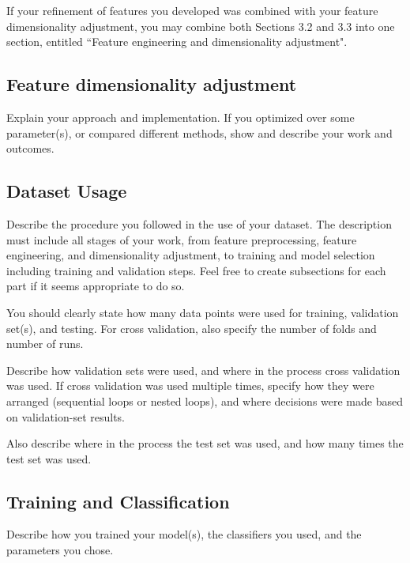 \documentclass[singlecolumn]{article}
\begin{document}
If your refinement of features you developed was combined with your feature dimensionality adjustment, you may combine both Sections 3.2 and 3.3 into one section, entitled ``Feature engineering and dimensionality adjustment".

\subsection{Feature dimensionality adjustment}
Explain your approach and implementation. If you optimized over some parameter(s), or compared different methods, show and describe your work and outcomes.

\subsection{Dataset Usage}
Describe the procedure you followed in the use of your dataset. The description must include all stages of your work, from feature preprocessing, feature engineering, and dimensionality adjustment, to training and model selection including training and validation steps. Feel free to create subsections for each part if it seems appropriate to do so.

You should clearly state how many data points were used for training, validation set(s), and testing. For cross validation, also specify the number of folds and number of runs. 

Describe how validation sets were used, and where in the process cross validation was used. If cross validation was used multiple times, specify how they were arranged (sequential loops or nested loops), and where decisions were made based on validation-set results.

Also describe where in the process the test set was used, and how many times the test set was used. 

\subsection{Training and Classification}
Describe how you trained your model(s), the classifiers you used, and the parameters you chose. 
\end{document}
